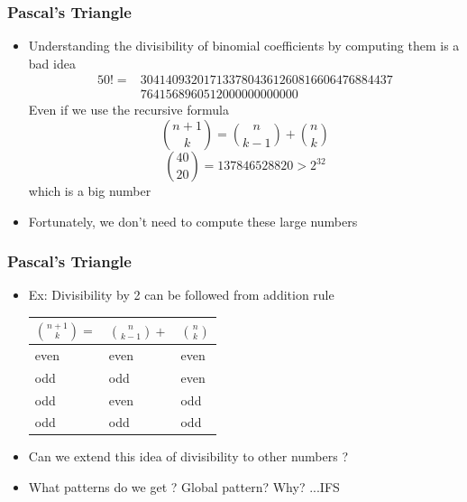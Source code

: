 \documentclass{beamer}
\begin{document}
\begin{frame}
    \frametitle{Pascal's Triangle}
    \begin{itemize}
        \item
        Understanding the divisibility of binomial coefficients by computing them is a bad idea
        \begin{align*}
            50! = &3041409320171337804361260816606476884437\\
            &7641568960512000000000000   
        \end{align*}
        Even if we use the recursive formula 
        \begin{equation*}
            \binom{n+1}{k}= \binom{n}{k-1} + \binom{n}{k}
        \end{equation*}
        \begin{equation*}
            \binom{40}{20} = 137846528820 > 2^{32}
        \end{equation*}
        which is a big number
        \item Fortunately, we don't need to compute these large numbers
        \end{itemize}
    
\end{frame}

\begin{frame}
    \frametitle{Pascal's Triangle}
    \begin{itemize}
        \item
        Ex: Divisibility by 2 can be followed from addition rule 
        \begin{table}[H]
            \begin{tabular}{|lll|}
                \hline
                $\binom{n+1}{k} = $ & $\binom{n}{k-1} + $& $\binom{n}{k}$\\
                \hline
                even & even & even \\
                odd  & odd  & even \\
                odd  & even & odd  \\
                odd  & odd  & odd  \\
                \hline
            \end{tabular}
        \end{table}
        \item
        Can we extend this idea of divisibility to other numbers ?
        \item
        What patterns do we get ? Global pattern? Why? ...IFS
    \end{itemize}
\end{frame}
\end{document}
